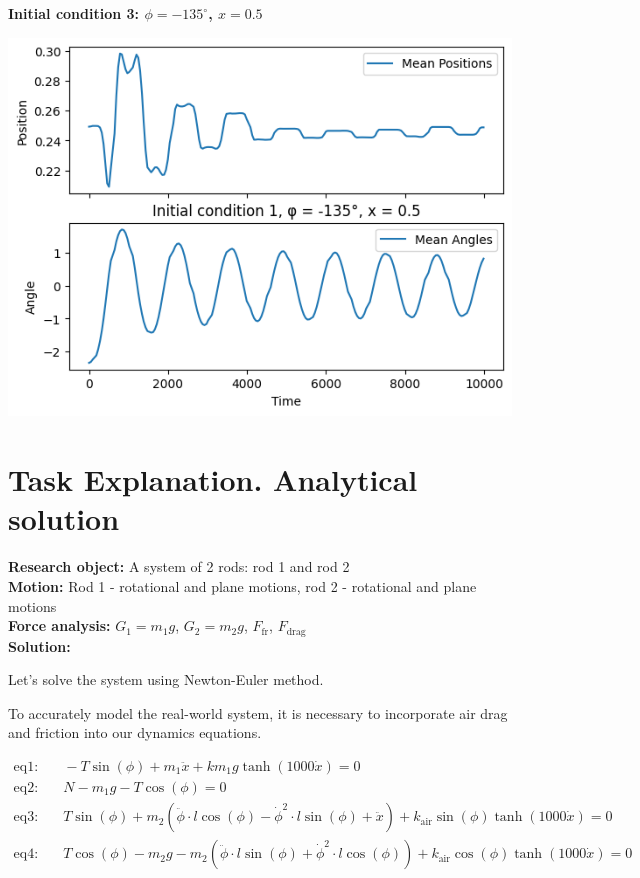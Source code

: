 \documentclass{article}
\begin{document}
\newpage 

\textbf{Initial condition 3: $\phi = -135^\circ$, $x = 0.5$}

\includegraphics*[scale=0.5]{plots/init3.png}

\section{Task Explanation. Analytical solution}

\textbf{Research object:} A system of 2 rods: rod 1 and rod 2\\
\textbf{Motion:} Rod 1 - rotational and plane motions, rod 2 - rotational and plane motions\\
\textbf{Force analysis:} $G_1 = m_1 g$, $G_2 = m_2 g$, $F_\text{fr}$, $F_\text{drag}$\\
\textbf{Solution:}

Let's solve the system using Newton-Euler method.

To accurately model the real-world system, it is necessary to incorporate air drag and friction into our dynamics equations.

\begin{align*}
  \text{eq1:} & \quad -T \sin(\phi) + m_1 \ddot{x} + k m_1 g \tanh(1000 \dot{x}) = 0 \\
  \text{eq2:} & \quad N - m_1 g - T \cos(\phi) = 0 \\
  \text{eq3:} & \quad T \sin(\phi) + m_2 \left(\ddot{\phi} \cdot l \cos(\phi) - \dot{\phi}^2 \cdot l \sin(\phi) + \ddot{x}\right) + k_{\text{air}} \sin(\phi) \tanh(1000 \dot{x}) = 0 \\
  \text{eq4:} & \quad T \cos(\phi) - m_2 g - m_2 \left(\ddot{\phi} \cdot l \sin(\phi) + \dot{\phi}^2 \cdot l \cos(\phi)\right) + k_{\text{air}} \cos(\phi) \tanh(1000 \dot{x}) = 0
\end{align*}
  
\end{document}
